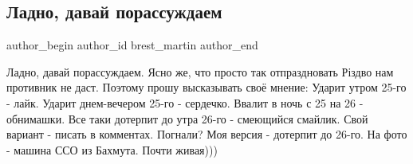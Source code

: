  
 
 
 
 
 
\subsection{Ладно, давай порассуждаем}
\label{sec:24_12_2022.fb.brest_martin.1.ladno}
 
\ifcmt
 author_begin
   author_id brest_martin
 author_end
\fi

\obeycr
Ладно, давай порассуждаем. Ясно же, что просто так отпраздновать Різдво нам противник не даст. Поэтому прошу высказывать своё мнение:
Ударит утром 25-го - лайк.
Ударит днем-вечером 25-го - сердечко.
Ввалит в ночь с 25 на 26 - обнимашки.
Все таки дотерпит до утра 26-го - смеющийся смайлик.
Свой вариант - писать в комментах.
Погнали?
Моя версия - дотерпит до 26-го.
На фото - машина ССО из Бахмута. Почти живая)))
\restorecr

